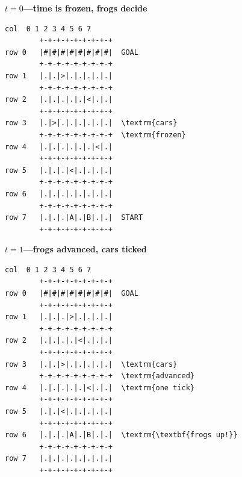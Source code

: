 \documentclass[12pt]{article}
\begin{document}
\begin{figure}[t]
\centering
%
\begin{minipage}[t]{0.43\textwidth}
\centering
{\small\textbf{$t=0$\;—\;time is frozen, frogs decide}}\\[6pt]
\begin{BVerbatim}[fontsize=\footnotesize,commandchars=\\\{\}]
    col  0 1 2 3 4 5 6 7
        +-+-+-+-+-+-+-+-+
row 0   |#|#|#|#|#|#|#|#|  GOAL
        +-+-+-+-+-+-+-+-+
row 1   |.|.|>|.|.|.|.|.|
        +-+-+-+-+-+-+-+-+
row 2   |.|.|.|.|.|<|.|.|
        +-+-+-+-+-+-+-+-+
row 3   |.|>|.|.|.|.|.|.|  \textrm{cars}
        +-+-+-+-+-+-+-+-+  \textrm{frozen}
row 4   |.|.|.|.|.|.|<|.|
        +-+-+-+-+-+-+-+-+
row 5   |.|.|.|<|.|.|.|.|
        +-+-+-+-+-+-+-+-+
row 6   |.|.|.|.|.|.|.|.|
        +-+-+-+-+-+-+-+-+
row 7   |.|.|.|A|.|B|.|.|  START
        +-+-+-+-+-+-+-+-+
\end{BVerbatim}
\end{minipage}
%
\hspace{0.5em}
\hspace{0.5em}
%
\begin{minipage}[t]{0.43\textwidth}
\centering
{\small\textbf{$t=1$\;—\;frogs advanced, cars ticked}}\\[6pt]
\begin{BVerbatim}[fontsize=\footnotesize,commandchars=\\\{\}]
    col  0 1 2 3 4 5 6 7
        +-+-+-+-+-+-+-+-+
row 0   |#|#|#|#|#|#|#|#|  GOAL
        +-+-+-+-+-+-+-+-+
row 1   |.|.|.|>|.|.|.|.|
        +-+-+-+-+-+-+-+-+
row 2   |.|.|.|.|<|.|.|.|
        +-+-+-+-+-+-+-+-+
row 3   |.|.|>|.|.|.|.|.|  \textrm{cars}
        +-+-+-+-+-+-+-+-+  \textrm{advanced}
row 4   |.|.|.|.|.|<|.|.|  \textrm{one tick}
        +-+-+-+-+-+-+-+-+
row 5   |.|.|<|.|.|.|.|.|
        +-+-+-+-+-+-+-+-+
row 6   |.|.|.|A|.|B|.|.|  \textrm{\textbf{frogs up!}}
        +-+-+-+-+-+-+-+-+
row 7   |.|.|.|.|.|.|.|.|
        +-+-+-+-+-+-+-+-+
\end{BVerbatim}
\end{minipage}


\end{figure}
\end{document}
